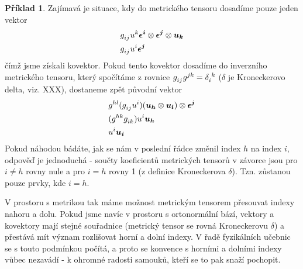 \documentclass[a5paper,12pt]{amsbook}
\theoremstyle{definition}
\newtheorem{example}{Příklad}[chapter]
\newcommand{\myvec}[1]{\bm{#1}}
\begin{document}
\begin{example}
Zajímavá je situace, kdy do metrického tensoru dosadíme pouze jeden vektor
\begin{equation*}
\begin{split}
&g\indices{_i_j} u^k \myvec{\epsilon^i}\otimes\myvec{\epsilon^j}\otimes\myvec{u_k} \\
&g\indices{_i_j} u^i \myvec{\epsilon^j}
\end{split}
\end{equation*}
čímž jsme získali kovektor. Pokud tento kovektor dosadíme do inverzního metrického
tensoru, který spočítáme z rovnice $g\indices{_i_j} g\indices{^j^k} = \delta\indices{_i^k}$
($\delta$ je Kroneckerovo delta, viz. XXX), dostaneme zpět původní vektor
\begin{equation*}
\begin{split}
&g\indices{^h^l} (g\indices{_i_j} u^i) (\myvec{u_h}\otimes\myvec{u_l})\otimes\myvec{\epsilon^j} \\
&(g\indices{^h^k} g\indices{_i_k}) u^i \myvec{u_h} \\
&u^i \myvec{u_i} \\
\end{split}
\end{equation*}
Pokud náhodou bádáte, jak se nám v poslední řádce změnil index $h$ na index $i$, odpověď
je jednoduchá - součty koeficientů metrických tensorů v závorce jsou pro $i\neq h$ rovny
nule a pro $i = h$ rovny 1 (z definice Kroneckerova $\delta$). Tzn. zůstanou pouze prvky,
kde $i = h$.

V prostoru s metrikou tak máme možnost metrickým tensorem přesouvat indexy nahoru a dolu.
Pokud jsme navíc v prostoru s ortonormální bází, vektory a kovektory mají stejné souřadnice
(metrický tensor se rovná Kroneckerovu $\delta$) a přestává mít význam rozlišovat horní
a dolní indexy. V řadě fyzikálních učebnic se s touto podmínkou počítá, a proto se konvence
s horními a dolními indexy vůbec nezavádí - k ohromné radosti samouků, kteří se to pak snaží
pochopit.

\end{example}
\end{document}
